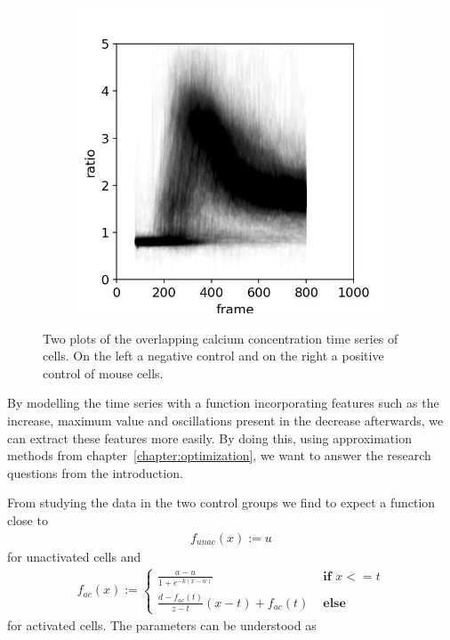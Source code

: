 \begin{figure}
\begin{subfigure}{0.45\linewidth}
		\includegraphics[width=\textwidth]{fig/all_cells_overlayed_mouse_pos}
	\end{subfigure}
	
	\caption{Two plots of the overlapping calcium concentration time series of cells. On the left a negative control and on the right a positive control of mouse cells.}
	\label{fig:all_cells_overlayed}
\end{figure}

By modelling the time series with a function incorporating features such as the increase, maximum value and oscillations present in the decrease afterwards, we can extract these features more easily. By doing this, using approximation methods from chapter~\ref{chapter:optimization}, we want to answer the research questions from the introduction.

From studying the data in the two control groups we find to expect a function close to
\begin{align}
	\label{math:function_unactivated_cell}
	f_{unac}(x) := u
\end{align}
for unactivated cells and
\begin{align}
	\label{math:function_activated_cell}
	f_{ac}(x) := \begin{cases}
		\frac{a-u}{1+ e^{-k(x-w)}} & \textbf{ if } x <= t\\
		\frac{d-f_{ac}(t)}{z-t} (x-t) + f_{ac}(t) & \textbf{ else}
	\end{cases}
\end{align}
for activated cells. The parameters can be understood as

